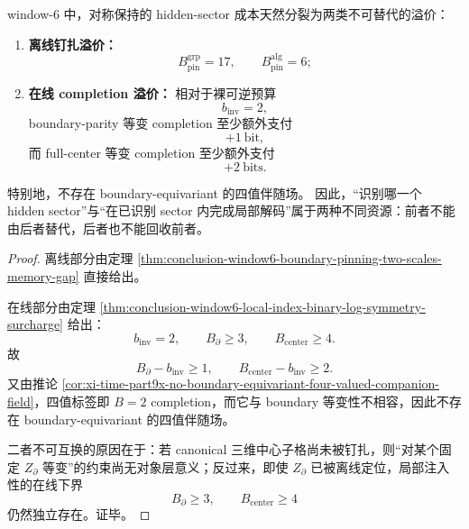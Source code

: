 \begin{theorem}\label{thm:conclusion-window6-boundary-offline-online-premium-bifurcation}
window-\(6\) 中，对称保持的 hidden-sector 成本天然分裂为两类不可替代的溢价：
\begin{enumerate}
  \item \textbf{离线钉扎溢价：}
  \[
  B_{\mathrm{pin}}^{\mathrm{grp}}=17,
  \qquad
  B_{\mathrm{pin}}^{\mathrm{alg}}=6;
  \]
  \item \textbf{在线 completion 溢价：}
  相对于裸可逆预算
  \[
  b_{\mathrm{inv}}=2,
  \]
  boundary-parity 等变 completion 至少额外支付
  \[
  +1\ \text{bit},
  \]
  而 full-center 等变 completion 至少额外支付
  \[
  +2\ \text{bits}.
  \]
\end{enumerate}
特别地，不存在 boundary-equivariant 的四值伴随场。
因此，“识别哪一个 hidden sector”与“在已识别 sector 内完成局部解码”属于两种不同资源：前者不能由后者替代，后者也不能回收前者。
\end{theorem}
\begin{proof}
离线部分由定理 \ref{thm:conclusion-window6-boundary-pinning-two-scales-memory-gap} 直接给出。

在线部分由定理 \ref{thm:conclusion-window6-local-index-binary-log-symmetry-surcharge} 给出：
\[
b_{\mathrm{inv}}=2,
\qquad
B_{\partial}\ge 3,
\qquad
B_{\mathrm{center}}\ge 4.
\]
故
\[
B_{\partial}-b_{\mathrm{inv}}\ge 1,
\qquad
B_{\mathrm{center}}-b_{\mathrm{inv}}\ge 2.
\]
又由推论 \ref{cor:xi-time-part9x-no-boundary-equivariant-four-valued-companion-field}，四值标签即 \(B=2\) completion，而它与 boundary 等变性不相容，因此不存在 boundary-equivariant 的四值伴随场。

二者不可互换的原因在于：若 canonical 三维中心子格尚未被钉扎，则“对某个固定 \(Z_{\partial}\) 等变”的约束尚无对象层意义；反过来，即使 \(Z_{\partial}\) 已被离线定位，局部注入性的在线下界
\[
B_{\partial}\ge 3,\qquad B_{\mathrm{center}}\ge 4
\]
仍然独立存在。证毕。
\end{proof}

